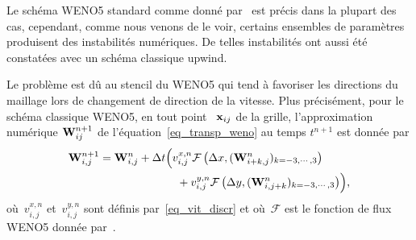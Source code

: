 \documentclass[main.tex]{subfiles}
\begin{document}


Le schéma WENO5 standard comme donné par~\cite{Liu1994} est précis dans la plupart des cas, cependant, comme nous venons de le voir, certains ensembles de paramètres%
 produisent des instabilités numériques. De telles instabilités ont aussi été constatées avec un schéma classique upwind. 

Le problème est dû au stencil du WENO5 qui tend à favoriser les directions du maillage lors de changement de direction de la vitesse. 
Plus précisément, pour le schéma classique WENO5, en tout point 
~$\mathbf{x}_{ij}$ de la grille, l'approximation numérique 
${\bf W}^{n+1}_{ij}$ de l'équation~\eqref{eq_transp_weno} au temps 
$t^{n+1}$ est donnée par
\begin{equation}\label{eq:WENO5}
\begin{aligned}
{\bf W}^{n+1}_{i,j}={\bf W}^n_{i,j} + \Delta t & \Bigl(v_{i,j}^{x,n}
\mathcal{F}\left(\Delta x,({\bf W}^n_{i+k,j})_{k=-3,\cdots, 3}\right) \\
&\quad +v_{i,j}^{y,n} \mathcal{F}\left(\Delta y,({\bf W}^n_{i,j+k})_{k=-3,\cdots, 3}\right)\Bigr),
\end{aligned}
\end{equation}
où~$v_{i,j}^{x,n} $ et~$v_{i,j}^{y,n}$ sont définis par~\eqref{eq_vit_discr} et où~$\mathcal{F}$ est le fonction de flux WENO5 donnée par~\cite{Liu1994}. 
\end{document}
